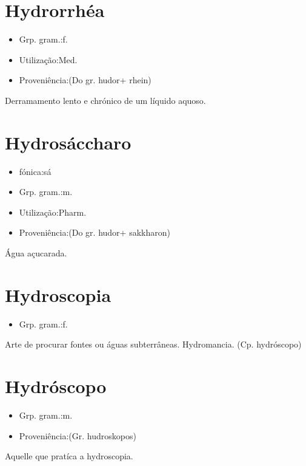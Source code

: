 \documentclass{article}
\begin{document}
\section{Hydrorrhéa}
\begin{itemize}
\item {Grp. gram.:f.}
\end{itemize}
\begin{itemize}
\item {Utilização:Med.}
\end{itemize}
\begin{itemize}
\item {Proveniência:(Do gr. \textunderscore hudor\textunderscore  + \textunderscore rhein\textunderscore )}
\end{itemize}
Derramamento lento e chrónico de um líquido aquoso.
\section{Hydrosáccharo}
\begin{itemize}
\item {fónica:sá}
\end{itemize}
\begin{itemize}
\item {Grp. gram.:m.}
\end{itemize}
\begin{itemize}
\item {Utilização:Pharm.}
\end{itemize}
\begin{itemize}
\item {Proveniência:(Do gr. \textunderscore hudor\textunderscore  + \textunderscore sakkharon\textunderscore )}
\end{itemize}
Água açucarada.
\section{Hydroscopia}
\begin{itemize}
\item {Grp. gram.:f.}
\end{itemize}
Arte de procurar fontes ou águas subterrâneas.
Hydromancia.
(Cp. \textunderscore hydróscopo\textunderscore )
\section{Hydróscopo}
\begin{itemize}
\item {Grp. gram.:m.}
\end{itemize}
\begin{itemize}
\item {Proveniência:(Gr. \textunderscore hudroskopos\textunderscore )}
\end{itemize}
Aquelle que pratíca a hydroscopia.
\end{document}
